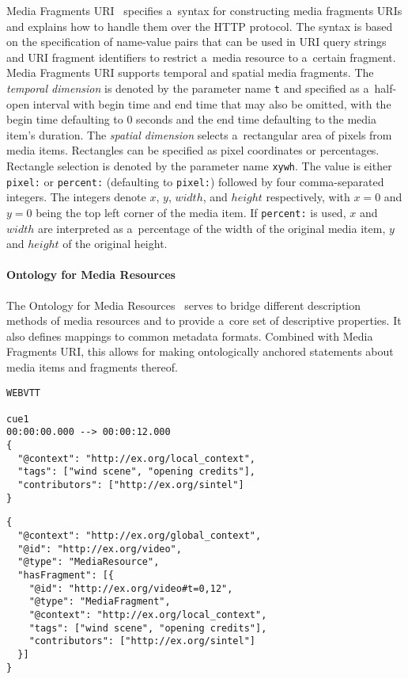 \documentclass{sig-alternate}
\newcommand{\inlinelistingsize}{\fontsize{8pt}{11pt}}
\let\oldurl\url
\renewcommand{\url}[1]{\inlinelistingsize\oldurl{#1}}
\def\JSONLD{\mbox{JSON-LD}}
\begin{document}
Media Fragments URI~\cite{troncy2012mediafragments}
specifies a~syntax for constructing media fragments URIs
and explains how to handle them over the HTTP protocol.
The syntax is based on the specification of
name-value pairs that can be used in URI query strings
and URI fragment identifiers to restrict a~media resource
to a~certain fragment.
Media Fragments URI supports temporal and spatial media fragments.
The \emph{temporal dimension} is denoted
by the parameter name \texttt{t} and specified
as a~half-open interval with begin time and end time
that may also be omitted,
with the begin time defaulting to 0 seconds
and the end time defaulting to the media item's duration.
The \emph{spatial dimension} selects
a~rectangular area of pixels from media items.
Rectangles can be specified as pixel coordinates or percentages.
Rectangle selection is denoted by the parameter name \texttt{xywh}.
The value is either \texttt{pixel:} or \texttt{percent:}
(defaulting to \texttt{pixel:})
followed by four comma-separated integers.
The integers denote $x$, $y$, $width$, and $height$ respectively,
with $x = 0$ and $y = 0$ being the top left corner of the media item.
If \texttt{percent:} is used, $x$ and $width$ are interpreted
as a~percentage of the width of the original media item,
$y$ and $height$
of the original height.

\paragraph{Ontology for Media Resources}

The Ontology for Media Resources~\cite{lee2012mediaontology}
serves to bridge different description methods of media resources
and to provide a~core set of descriptive properties.
It also defines mappings to common metadata formats.
Combined with Media Fragments URI,
this allows for making ontologically anchored statements
about media items and fragments thereof.

\begin{lstlisting}[caption={Sample WebVTT metadata file},
  label=listing:webvtt, float=t!]
WEBVTT

cue1
00:00:00.000 --> 00:00:12.000
{
  "@context": "http://ex.org/local_context",
  "tags": ["wind scene", "opening credits"],
  "contributors": ["http://ex.org/sintel"]
}
\end{lstlisting}

\begin{lstlisting}[caption={Generated \JSONLD~for the Web of Data, see
    \url{http://bit.ly/webvtt-jsonld} for the RDF triples},
  label=listing:jsonld, float=t!]
{
  "@context": "http://ex.org/global_context",
  "@id": "http://ex.org/video",
  "@type": "MediaResource",
  "hasFragment": [{
    "@id": "http://ex.org/video#t=0,12",
    "@type": "MediaFragment",
    "@context": "http://ex.org/local_context",
    "tags": ["wind scene", "opening credits"],
    "contributors": ["http://ex.org/sintel"]
  }]
}
\end{lstlisting}
\end{document}
